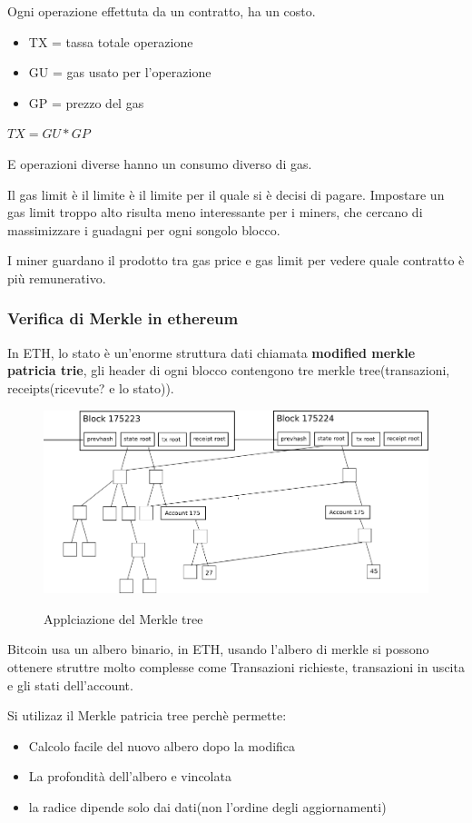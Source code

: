 Ogni operazione effettuta da un contratto, ha un costo.
\begin{itemize}
    \item TX = tassa totale operazione
    \item GU = gas usato per l'operazione
    \item GP = prezzo del gas
\end{itemize}

\begin{math}
    TX = GU * GP
\end{math}

E operazioni diverse hanno un consumo diverso di gas.

Il gas limit è il limite è il limite per il quale si è decisi di pagare.
Impostare un gas limit troppo alto risulta meno interessante per i miners, che cercano di massimizzare i guadagni per ogni songolo blocco.

I miner guardano il prodotto tra gas price e gas limit per vedere quale contratto è più remunerativo.

\subsubsection{Verifica di Merkle in ethereum}
In ETH, lo stato è un'enorme struttura dati chiamata \textbf{modified merkle patricia trie}, gli header di ogni blocco 
contengono tre merkle tree(transazioni, receipts(ricevute? e lo stato)).

\begin{figure}[h!]
    \centering
    \includegraphics[width=0.5\linewidth]{imgs/17 - merkle tree.png}
    \label{fig:merkle_proof}
    \caption{Applciazione del Merkle tree}
\end{figure}

Bitcoin usa un albero binario, in ETH, usando l'albero di merkle si possono ottenere struttre molto complesse come
Transazioni richieste, transazioni in uscita e gli stati dell'account.

Si utilizaz il Merkle patricia tree perchè permette:
\begin{itemize}
    \item Calcolo facile del nuovo albero dopo la modifica
    \item La profondità dell'albero e vincolata
    \item la radice dipende solo dai dati(non l'ordine degli aggiornamenti)
\end{itemize}



